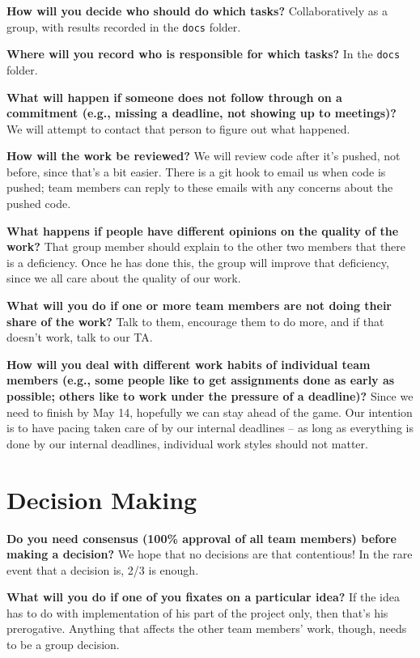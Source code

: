 \documentclass[11pt]{article}
\newcommand{\question}[2]{{\noindent\bf #1}\newline #2 \newline}
\begin{document}
\question{How will you decide who should do which tasks?}{
Collaboratively as a group, with results recorded in the \texttt{docs} folder.}

\question{Where will you record who is responsible for which tasks?}{
In the \texttt{docs} folder.}

\question{What will happen if someone does not follow through on a commitment (e.g., missing a deadline, not showing up to meetings)?}{
We will attempt to contact that person to figure out what happened.}

\question{How will the work be reviewed?}{
We will review code after it's pushed, not before, since that's a bit easier. There is a git hook to email us when code is pushed; team members can reply to these emails with any concerns about the pushed code.}

\question{What happens if people have different opinions on the quality of the work?}{
That group member should explain to the other two members that there is a deficiency.  Once he has done this, the group will improve that deficiency, since we all care about the quality of our work.}

\question{What will you do if one or more team members are not doing their share of the work?}{
Talk to them, encourage them to do more, and if that doesn't work, talk to our TA.}

\question{How will you deal with different work habits of individual team members (e.g., some people like to get assignments done as early as possible; others like to work under the pressure of a deadline)?}{
Since we need to finish by May 14, hopefully we can stay ahead of the game.  Our intention is to have pacing taken care of by our internal deadlines -- as long as everything is done by our internal deadlines, individual work styles should not matter.}

\section{Decision Making}
\question{Do you need consensus (100\% approval of all team members) before making a decision?}{
We hope that no decisions are that contentious! In the rare event that a decision is, 2/3 is enough.}

\question{What will you do if one of you fixates on a particular idea?}{
If the idea has to do with implementation of his part of the project only, then that's his prerogative.  Anything that affects the other team members' work, though, needs to be a group decision.}
\end{document}
